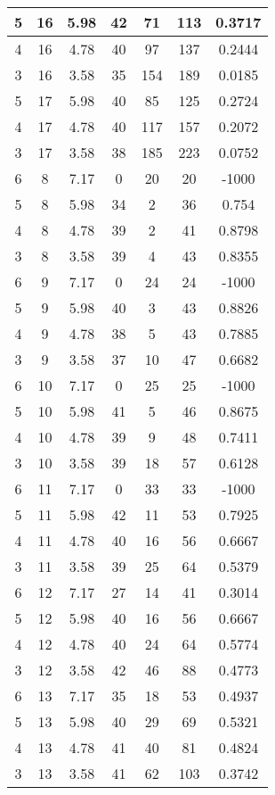 \documentclass[letterpaper, 12pt]{article}
\begin{document}
\begin{longtable}{|c|c|c|c|c|c|c|}
\hline
5 & 16 & 5.98 & 42 & 71 & 113 & 0.3717 \\
\hline
4 & 16 & 4.78 & 40 & 97 & 137 & 0.2444 \\
\hline
3 & 16 & 3.58 & 35 & 154 & 189 & 0.0185 \\
\hline
5 & 17 & 5.98 & 40 & 85 & 125 & 0.2724 \\
\hline
4 & 17 & 4.78 & 40 & 117 & 157 & 0.2072 \\
\hline
3 & 17 & 3.58 & 38 & 185 & 223 & 0.0752 \\
\hline
6 & 8 & 7.17 & 0 & 20 & 20 & -1000 \\
\hline
5 & 8 & 5.98 & 34 & 2 & 36 & 0.754 \\
\hline
4 & 8 & 4.78 & 39 & 2 & 41 & 0.8798 \\
\hline
3 & 8 & 3.58 & 39 & 4 & 43 & 0.8355 \\
\hline
6 & 9 & 7.17 & 0 & 24 & 24 & -1000 \\
\hline
5 & 9 & 5.98 & 40 & 3 & 43 & 0.8826 \\
\hline
4 & 9 & 4.78 & 38 & 5 & 43 & 0.7885 \\
\hline
3 & 9 & 3.58 & 37 & 10 & 47 & 0.6682 \\
\hline
6 & 10 & 7.17 & 0 & 25 & 25 & -1000 \\
\hline
5 & 10 & 5.98 & 41 & 5 & 46 & 0.8675 \\
\hline
4 & 10 & 4.78 & 39 & 9 & 48 & 0.7411 \\
\hline
3 & 10 & 3.58 & 39 & 18 & 57 & 0.6128 \\
\hline
6 & 11 & 7.17 & 0 & 33 & 33 & -1000 \\
\hline
5 & 11 & 5.98 & 42 & 11 & 53 & 0.7925 \\
\hline
4 & 11 & 4.78 & 40 & 16 & 56 & 0.6667 \\
\hline
3 & 11 & 3.58 & 39 & 25 & 64 & 0.5379 \\
\hline
6 & 12 & 7.17 & 27 & 14 & 41 & 0.3014 \\
\hline
5 & 12 & 5.98 & 40 & 16 & 56 & 0.6667 \\
\hline
4 & 12 & 4.78 & 40 & 24 & 64 & 0.5774 \\
\hline
3 & 12 & 3.58 & 42 & 46 & 88 & 0.4773 \\
\hline
6 & 13 & 7.17 & 35 & 18 & 53 & 0.4937 \\
\hline
5 & 13 & 5.98 & 40 & 29 & 69 & 0.5321 \\
\hline
4 & 13 & 4.78 & 41 & 40 & 81 & 0.4824 \\
\hline
3 & 13 & 3.58 & 41 & 62 & 103 & 0.3742 \\

\end{longtable}
\end{document}
